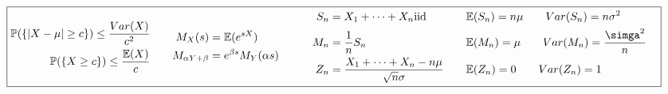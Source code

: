 \documentclass[10pt]{article}
\begin{document}
\begin{equation*}
  \boxed{
    \begin{aligned}
      \begin{aligned}
        \mathbb{P}(\{|X-\mu | \geq c\}) \leq \frac{Var(X)}{c^2} \\
        \mathbb{P}(\{X\geq c\}) \leq \frac{\mathbb{E}(X)}{c} \\
      \end{aligned}
      \qquad &
      \begin{aligned}
        M_X(s) &= \mathbb{E}(e^{sX}) \\
        M_{\alpha Y+\beta} &= e^{\beta s}M_Y(\alpha s) \\
      \end{aligned}
      \qquad &&
      \begin{aligned}
        S_n &= X_1 + \dots + X_n \text{iid}
        &&\mathbb{E}(S_n) = n \mu \qquad Var(S_n)=n\sigma^2 \\
        M_n &= \frac{1}{n} S_n
        &&\mathbb{E}(M_n) = \mu \qquad Var(M_n)=\frac{\simga^2}{n} \\
        Z_n &= \frac{X_1 +\dots+ X_n -n\mu}{\sqrt{n}\sigma}
        \quad &&\mathbb{E}(Z_n) = 0 \qquad Var(Z_n) = 1
      \end{aligned}
    \end{aligned}
  }
\end{equation*}
\end{document}
